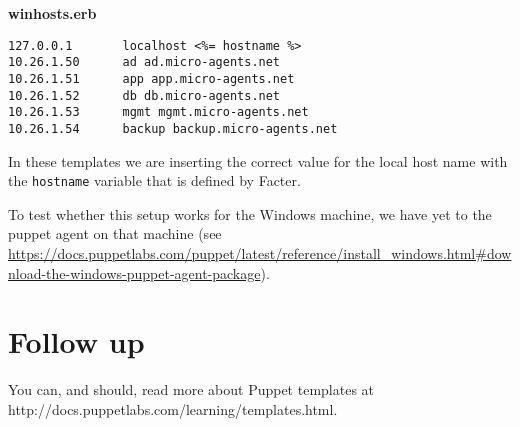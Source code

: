 \documentclass{article}   	%
\begin{document}
\textbf{winhosts.erb}
\begin{verbatim}
127.0.0.1       localhost <%= hostname %>
10.26.1.50      ad ad.micro-agents.net
10.26.1.51      app app.micro-agents.net
10.26.1.52      db db.micro-agents.net
10.26.1.53      mgmt mgmt.micro-agents.net
10.26.1.54      backup backup.micro-agents.net

\end{verbatim}

In these templates we are inserting the correct value for the local host name with the \texttt{hostname} variable that is defined by Facter.

To test whether this setup works for the Windows machine, we have yet to the puppet agent on that machine (see {\small \url{https://docs.puppetlabs.com/puppet/latest/reference/install_windows.html#download-the-windows-puppet-agent-package}}).

\section{Follow up}
You can, and should, read more about Puppet templates at http://docs.puppetlabs.com/learning/templates.html.
\end{document}
